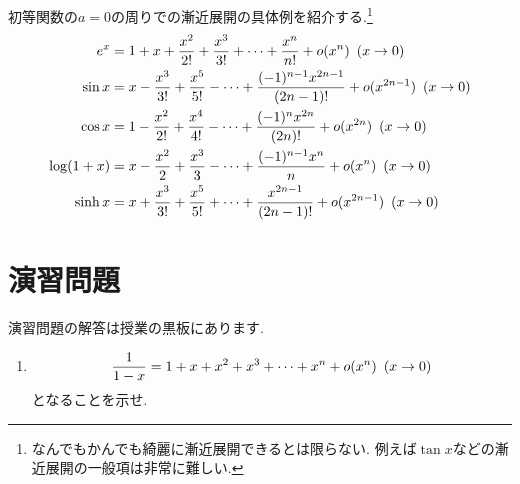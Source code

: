 \documentclass[dvipdfmx,a4paper,11pt]{article}
\theoremstyle{definition}
\begin{document}
 初等関数の$a=0$の周りでの漸近展開の具体例を紹介する.\footnote{なんでもかんでも綺麗に漸近展開できるとは限らない. 例えば$\tan x$などの漸近展開の一般項は非常に難しい.}
\begin{align*}
\begin{split}
e^x &= 1 + x+  \frac{x^2}{2!} + \frac{x^3}{3!}  + \cdots  + 
 \frac{ x^{n}}{n!} + o(x^{n}) \text{\,\,\,}(x \rightarrow 0) \\
\sin x &= x - \frac{x^3}{3!} + \frac{x^5}{5!} - \cdots  + 
 \frac{(-1)^{n-1} x^{2n-1}}{(2n-1)!} 
 + o(x^{2n-1}) \text{\,\,\,}(x \rightarrow 0) \\
 \cos x &= 1 - \frac{x^2}{2!} + \frac{x^4}{4!} - \cdots  + 
 \frac{(-1)^{n} x^{2n}}{(2n)!} 
 + o(x^{2n}) \text{\,\,\,}(x \rightarrow 0) \\
 \log(1+x) &= x - \frac{x^2}{2} + \frac{x^3}{3}  - \cdots   
 + \frac{ (-1)^{n-1}x^{n}}{n} + o(x^{n}) \text{\,\,\,}(x \rightarrow 0) \\
  \sinh x &= x + \frac{x^3}{3!} + \frac{x^5}{5!} + \cdots  + 
 \frac{x^{2n-1}}{(2n-1)!} 
 + o(x^{2n-1}) \text{\,\,\,}(x \rightarrow 0) \\
\end{split}
\end{align*}

 
\section{演習問題}
演習問題の解答は授業の黒板にあります.
\begin{enumerate}
\item 
$$
\frac{1}{1-x} = 1 + x+  x^2 + x^3  + \cdots   
 + x^{n} + o(x^{n}) \text{\,\,\,}(x \rightarrow 0) 
$$
となることを示せ.

\end{enumerate}
\end{document}
